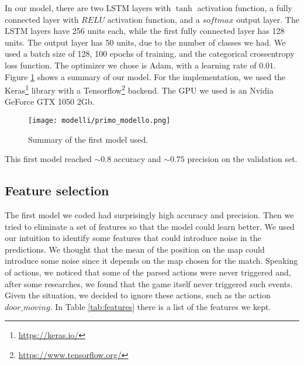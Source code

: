 		
		In our model, there are two LSTM layers with $\tanh$ activation function, a fully connected layer with $RELU$ activation  function, and a $softmax$ output layer.
		The LSTM layers have 256 units each, while the first fully connected layer has 128 units. 
		The output layer has 50 units, due to the number of classes we had. 
		We used a batch size of 128, 100 epochs of training, and the categorical crossentropy loss function. 
		The optimizer we chose is Adam, with a learning rate of $0.01$. 
		Figure \ref{fig:mod1} shows a summary of our model. 
		For the implementation, we used the Keras\footnote{\href{https://keras.io/}{https://keras.io/}} library with a Tensorflow\footnote{\href{https://www.tensorflow.org/}{https://www.tensorflow.org/}} backend. 
		The GPU we used is an Nvidia GeForce GTX 1050 2Gb.
		
		\begin{figure}[!h] 
			\centering 
			\texttt{[image: modelli/primo\_modello.png]}
			\caption{\label{fig:mod1}Summary of the first model used.}
		\end{figure}
		
		This first model reached $\sim 0.8$ accuracy and $\sim 0.75$ precision on the validation set. 
		
	\subsection{Feature selection}
	
		The first model we coded had surprisingly high accuracy and precision. 
		Then we tried to eliminate a set of features so that the model could learn better. 
		We used our intuition to identify some features that could introduce noise in the predictions. 
		We thought that the mean of the position on the map could introduce some noise since it depends on the map chosen for the match. 
		Speaking of actions, we noticed that some of the parsed actions were never triggered and, after some researches, we found that the game itself never triggered such events. 
		Given the situation, we decided to ignore these actions, such as the action $door\_moving$. 
		In Table \ref{tab:features} there is a list of the features we kept. 
		
